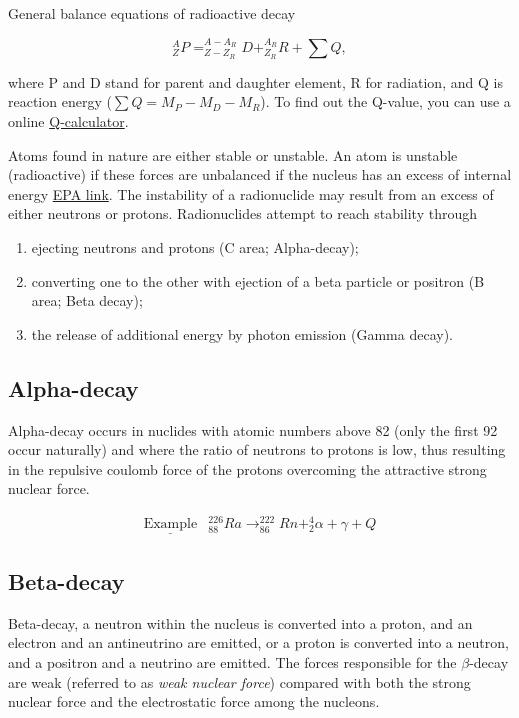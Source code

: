 \documentclass[]{book}
\providecommand{\tightlist}{%
  \setlength{\itemsep}{0pt}\setlength{\parskip}{0pt}}
\theoremstyle{definition}
\theoremstyle{definition}
\theoremstyle{definition}
\theoremstyle{remark}
\begin{document}
General balance equations of radioactive decay

\begin{equation}
 _Z^A P = ^{A-A_R}_{Z-Z_R}D + _{Z_R}^{A_R}R + \sum Q, 
\end{equation}

where P and D stand for parent and daughter element, R for radiation,
and Q is reaction energy (\(\sum Q = M_P-M_D-M_R\)). To find out the
Q-value, you can use a online
\href{http://www.nndc.bnl.gov/qcalc/}{Q-calculator}.

Atoms found in nature are either stable or unstable. An atom is unstable
(radioactive) if these forces are unbalanced if the nucleus has an
excess of internal energy
\href{http://www.epa.gov/radiation/understand/radiation.html}{EPA link}.
The instability of a radionuclide may result from an excess of either
neutrons or protons. Radionuclides attempt to reach stability through

\begin{enumerate}
\def\labelenumi{\arabic{enumi}.}
\tightlist
\item
  ejecting neutrons and protons (C area; Alpha-decay);
\item
  converting one to the other with ejection of a beta particle or
  positron (B area; Beta decay);
\item
  the release of additional energy by photon emission (Gamma decay).
\end{enumerate}

\subsection{Alpha-decay}\label{alpha}

Alpha-decay occurs in nuclides with atomic numbers above 82 (only the
first 92 occur naturally) and where the ratio of neutrons to protons is
low, thus resulting in the repulsive coulomb force of the protons
overcoming the attractive strong nuclear force.

\[
\begin{matrix}
\underline{\text{Example}} & _{88}^{226}Ra\rightarrow _{86}^{222}Rn +_2^4\alpha +\gamma +Q
\end{matrix}
\]

\subsection{Beta-decay}\label{beta}

Beta-decay, a neutron within the nucleus is converted into a proton, and
an electron and an antineutrino are emitted, or a proton is converted
into a neutron, and a positron and a neutrino are emitted. The forces
responsible for the \(\beta\)-decay are weak (referred to as \emph{weak
nuclear force}) compared with both the strong nuclear force and the
electrostatic force among the nucleons.
\end{document}
